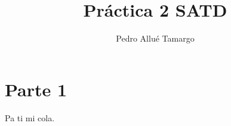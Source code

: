 \documentclass[10pt,a4paper]{article}
\begin{document}
\begin{titlepage}
\author{Pedro Allué Tamargo}
\title{Práctica 2 SATD}
\clearpage\maketitle
\thispagestyle{empty}
\tableofcontents
\end{titlepage}

\section{Parte 1}

Pa ti mi cola.
\end{document}
